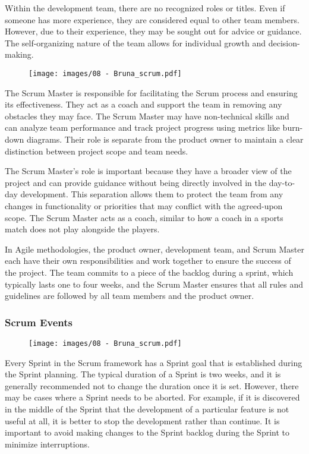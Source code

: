 Within the development team, there are no recognized roles or titles.
Even if someone has more experience, they are considered equal to other
team members. However, due to their experience, they may be sought out
for advice or guidance. The self-organizing nature of the team allows
for individual growth and decision-making.

\begin{figure}[!h]
    \centering
    \texttt{[image: images/08 - Bruna\_scrum.pdf]}
\end{figure}

The Scrum Master is responsible for facilitating the Scrum process and
ensuring its effectiveness. They act as a coach and support the team in
removing any obstacles they may face. The Scrum Master may have
non-technical skills and can analyze team performance and track project
progress using metrics like burn-down diagrams. Their role is separate
from the product owner to maintain a clear distinction between project
scope and team needs.

The Scrum Master's role is important because they have a broader view of
the project and can provide guidance without being directly involved in
the day-to-day development. This separation allows them to protect the
team from any changes in functionality or priorities that may conflict
with the agreed-upon scope. The Scrum Master acts as a coach, similar to
how a coach in a sports match does not play alongside the players.

In Agile methodologies, the product owner, development team, and Scrum
Master each have their own responsibilities and work together to ensure
the success of the project. The team commits to a piece of the backlog
during a sprint, which typically lasts one to four weeks, and the Scrum
Master ensures that all rules and guidelines are followed by all team
members and the product owner.

\subsubsection{Scrum Events}

\begin{figure}[!h]
    \centering
    \texttt{[image: images/08 - Bruna\_scrum.pdf]}
\end{figure}

Every Sprint in the Scrum framework has a Sprint goal that is
established during the Sprint planning. The typical duration of a Sprint
is two weeks, and it is generally recommended not to change the duration
once it is set. However, there may be cases where a Sprint needs to be
aborted. For example, if it is discovered in the middle of the Sprint
that the development of a particular feature is not useful at all, it is
better to stop the development rather than continue. It is important to
avoid making changes to the Sprint backlog during the Sprint to minimize
interruptions.

